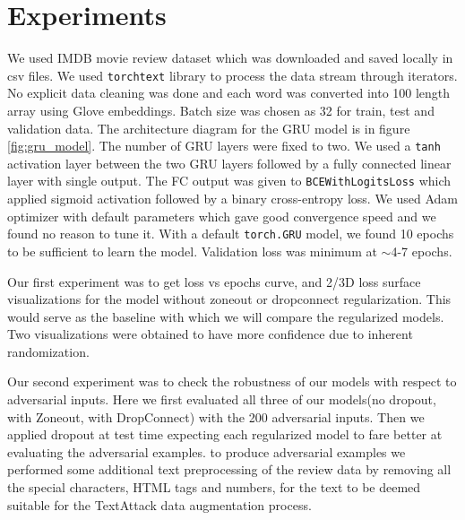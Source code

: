\documentclass{article}
\begin{document}
\section{Experiments}


We used IMDB movie review dataset which was downloaded and saved locally in csv files. We used \texttt{torchtext} library to process the data stream through iterators. No explicit data cleaning was done and each word was converted into 100 length array using Glove embeddings. Batch size was chosen as 32 for train, test and validation data. The architecture diagram for the GRU model is in figure \ref{fig:gru_model}. The number of GRU layers were fixed to two. We used a \texttt{tanh} activation layer between the two GRU layers followed by a fully connected linear layer with single output. The FC output was given to \texttt{BCEWithLogitsLoss} which applied sigmoid activation followed by a binary cross-entropy loss. We used Adam optimizer with default parameters which gave good convergence speed and we found no reason to tune it. With a default \texttt{torch.GRU} model, we found 10 epochs to be sufficient to learn the model. Validation loss was minimum at $\sim$4-7 epochs.

Our first experiment was to get loss vs epochs curve, and 2/3D loss surface visualizations for the model without zoneout or dropconnect regularization. This would serve as the baseline with which we will compare the regularized models. Two visualizations were obtained to have more confidence due to inherent randomization.

Our second experiment was  to check the robustness of our models with respect to adversarial inputs. Here we first evaluated all three of our models(no dropout, with Zoneout, with DropConnect) with the 200 adversarial inputs. Then we applied dropout at test time expecting each regularized model to fare better at evaluating the adversarial examples. to produce adversarial examples we performed some additional text preprocessing of the review data by removing all the special characters, HTML tags and numbers, for the text to be deemed suitable for the TextAttack data augmentation process.
\end{document}
